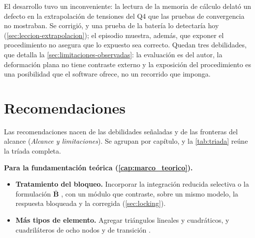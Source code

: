 El desarrollo tuvo un inconveniente: la lectura de la memoria de cálculo delató un defecto en la extrapolación de tensiones del Q4 que las pruebas de convergencia no mostraban. Se corrigió, y una prueba de la batería lo detectaría hoy (\autoref{sec:leccion-extrapolacion}); el episodio muestra, además, que exponer el procedimiento no asegura que lo expuesto sea correcto. Quedan tres debilidades, que detalla la \autoref{sec:limitaciones-observadas}: la evaluación es del autor, la deformación plana no tiene contraste externo y la exposición del procedimiento es una posibilidad que el software ofrece, no un recorrido que imponga.

\FloatBarrier
\section*{Recomendaciones}

Las recomendaciones nacen de las debilidades señaladas y de las fronteras del alcance (\emph{Alcance y limitaciones}). Se agrupan por capítulo, y la \autoref{tab:triada} reúne la tríada completa.

\noindent\textbf{Para la fundamentación teórica (\autoref{cap:marco_teorico}).}
\begin{itemize}
    \item \textbf{Tratamiento del bloqueo.} Incorporar la integración reducida selectiva o la formulación $\bar{\bm{B}}$ \autocites[pp.~221, 232-234]{hughes2000fem}[pp.~476-477]{bathe2014fem}, con un módulo que contraste, sobre un mismo modelo, la respuesta bloqueada y la corregida (\autoref{sec:locking}).
    \item \textbf{Más tipos de elemento.} Agregar triángulos lineales y cuadráticos, y cuadriláteros de ocho nodos y de transición \autocites[pp.~167-174, 194]{onate2009structural}{reddy2006introduction}.
\end{itemize}

